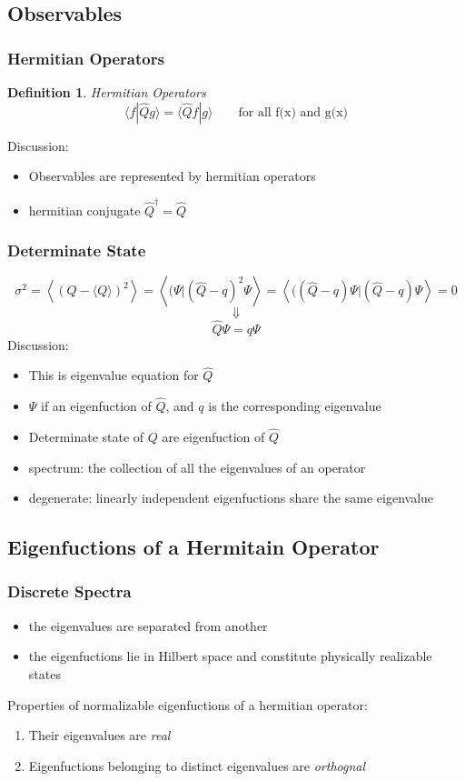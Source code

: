 \documentclass[a4paper,12pt]{article}
\newtheorem{dfn}[thm]{Definition}
\begin{document}
\subsection{Observables}

\subsubsection{Hermitian Operators}

\begin{dfn}
       Hermitian Operators
       \[\langle f|\hat{Q}g \rangle =\langle \hat{Q}f|g \rangle \qquad \text{for all f(x) and g(x)} \]
\end{dfn}
Discussion:
\begin{itemize}
       \item Observables are represented by hermitian operators
       \item hermitian conjugate \(\hat{Q}^\dag = \hat{Q}\)
\end{itemize}

\subsubsection{Determinate State}

\[ \sigma^2 = \left\langle(Q-\langle Q \rangle)^2\right\rangle = 
       \left\langle(\Psi|(\hat{Q}-q)^2\Psi \right\rangle = 
       \left\langle((\hat{Q}-q)\Psi|(\hat{Q}-q)\Psi \right\rangle =0\]
\[\Downarrow\]
\[ \hat{Q}\Psi = q\Psi\]
Discussion:
\begin{itemize}
       \item This is eigenvalue equation for \(\hat{Q}\)
       \item \(\Psi\) if an eigenfuction of \(\hat{Q}\), and \(q\) is the corresponding eigenvalue
       \item Determinate state of \(Q\) are eigenfuction of \(\hat{Q}\)
       \item spectrum: the collection of all the eigenvalues of an operator
       \item degenerate: linearly independent eigenfuctions share the same eigenvalue
\end{itemize}
\subsection{Eigenfuctions of a Hermitain Operator}
\subsubsection{Discrete Spectra}
\begin{itemize}
       \item the eigenvalues are separated from another
       \item the eigenfuctions lie in Hilbert space and constitute physically realizable states
\end{itemize}
Properties of normalizable eigenfuctions of a hermitian operator:
\begin{enumerate}
       \item Their eigenvalues are \emph{real}
       \item Eigenfuctions belonging to distinct eigenvalues are \emph{orthognal}
\end{enumerate}
\end{document}
